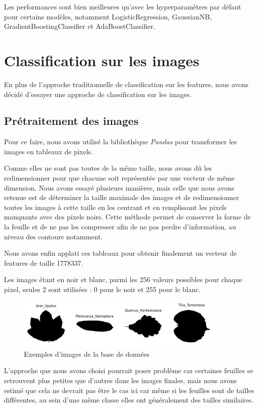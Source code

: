 \documentclass{article}
\begin{document}
Les performances sont bien meilleures qu'avec les hyperparamètres par défaut pour certains
modèles, notamment LogisticRegression, GaussianNB, GradientBoostingClassifier
et AdaBoostClassifier.

\newpage
\section{Classification sur les images}
En plus de l'approche traditionnelle de classification sur les features, nous avons
décidé d'essayer une approche de classification sur les images. 

\subsection{Prétraitement des images}
Pour ce faire, nous avons
utilisé la bibliothèque \textit{Pandas} \cite{pandas} pour transformer les images en
tableaux de pixels.

Comme elles ne sont pas toutes de la même taille, nous avons dû les redimensionner
pour que chacune soit représentée par une vecteur de même dimension. Nous avons
essayé plusieurs manières,
mais celle que nous avons retenue est de déterminer la taille maximale des images
et de redimensionner toutes les images à cette taille en les centrant et en remplissant
les pixels manquants avec des pixels noirs. Cette méthode permet de conserver
la forme de la feuille et de ne pas les compresser afin de ne pas perdre d'information,
au niveau des contours notamment.

Nous avons enfin applati ces tableaux pour obtenir finalement un vecteur de features de taille
1778337.

Les images étant en noir et blanc, parmi les 256 valeurs possibles pour chaque pixel,
seules 2 sont utilisées : 0 pour le noir et 255 pour le blanc.

\begin{figure}[h]
    \centering
    \includegraphics[width=0.9\textwidth]{img/img_examples.png}
    \caption{Exemples d'images de la base de données}
\end{figure}



L'approche que nous avons choisi pourrait poser problème car certaines feuilles se
retrouvent plus petites que d'autres dans les images finales, mais nous avons estimé
que cela ne devrait pas être le cas ici car même si les feuilles sont de tailles
différentes, au sein d'une même classe elles ont généralement des tailles similaires.
\end{document}
